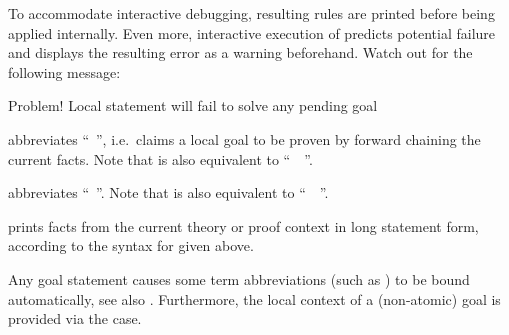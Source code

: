 \begin{isabellebody}
\begin{isamarkuptext}
\begin{descr}
  To accommodate interactive debugging, resulting rules are printed
  before being applied internally.  Even more, interactive execution
  of \hyperlink{command.show}{\mbox{}} predicts potential failure and displays the
  resulting error as a warning beforehand.  Watch out for the
  following message:

  \begin{ttbox}
  Problem! Local statement will fail to solve any pending goal
  \end{ttbox}
  
  \item [\hyperlink{command.hence}{\mbox{\isa{\isacommand{hence}}}}] abbreviates ``\hyperlink{command.then}{\mbox{}}~\hyperlink{command.have}{\mbox{}}'', i.e.\ claims a local goal to be proven by forward
  chaining the current facts.  Note that \hyperlink{command.hence}{\mbox{}} is also
  equivalent to ``\hyperlink{command.from}{\mbox{}}~~\hyperlink{command.have}{\mbox{}}''.
  
  \item [\hyperlink{command.thus}{\mbox{\isa{\isacommand{thus}}}}] abbreviates ``\hyperlink{command.then}{\mbox{}}~\hyperlink{command.show}{\mbox{}}''.  Note that \hyperlink{command.thus}{\mbox{}} is also equivalent to
  ``\hyperlink{command.from}{\mbox{}}~~\hyperlink{command.show}{\mbox{}}''.
  
  \item [\hyperlink{command.print-statement}{\mbox{\isa{\isacommand{print{\isacharunderscore}statement}}}}~\isa{a}] prints facts from the
  current theory or proof context in long statement form, according to
  the syntax for \hyperlink{command.lemma}{\mbox{}} given above.

  \end{descr}

  Any goal statement causes some term abbreviations (such as
  \hyperlink{variable.?thesis}{\mbox{}}) to be bound automatically, see also
  .  Furthermore, the local context of a
  (non-atomic) goal is provided via the \hyperlink{case.rule-context}{\mbox{}} case.


\end{isamarkuptext}
\end{isabellebody}
